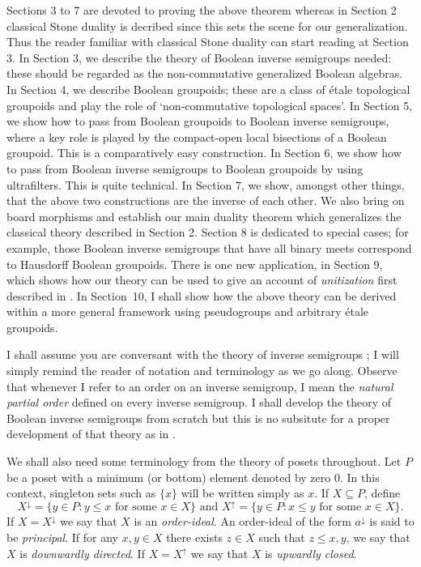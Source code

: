 \documentclass[a4paper]{amsart}
\begin{document}
Sections 3 to 7 are devoted to proving the above theorem
whereas in Section 2 classical Stone duality is decribed since this sets the scene for our generalization.
Thus the reader familiar with classical Stone duality can start reading at Section 3.
In Section 3, we describe the theory of Boolean inverse semigroups needed:
these should be regarded as the non-commutative generalized Boolean algebras.
In Section 4, we describe Boolean groupoids; these are a class of \'etale topological groupoids 
and play the role of `non-commutative topological spaces'.  
In Section 5, we show how to pass from Boolean groupoids to Boolean inverse semigroups,
where a key role is played by the compact-open local bisections of a Boolean groupoid.
This is a comparatively easy construction.
In Section 6, we show how to pass from Boolean inverse semigroups to Boolean groupoids by using ultrafilters.
This is quite technical.
In Section 7, we show, amongst other things, that the above two constructions are the inverse of each other.
We also bring on board morphisms and establish our main duality theorem which generalizes  the classical theory
described in Section 2.
Section 8 is dedicated to special cases; for example, those Boolean inverse semigroups
that have all binary meets correspond to Hausdorff Boolean groupoids.
There is one new application, in Section 9, which shows how our theory can be used to give an account 
of {\em unitization} first described in \cite[Definition 6.6.1]{W}.
In Section~10, I shall show how the above theory can be derived within a more general framework
using pseudogroups and arbitrary \'etale groupoids.

I shall assume you are conversant with the theory of inverse semigroups \cite{Lawson1998};
I will simply remind the reader of notation and terminology as we go along.
Observe that whenever I refer to an order on an inverse semigroup, 
I mean the {\em natural partial order} defined on every inverse semigroup.
I shall develop the theory of Boolean inverse semigroups from scratch
but this is no subsitute for a proper development of that theory as in \cite{W}.

We shall also need some terminology from the theory of posets throughout.
Let $P$ be a poset with a minimum (or bottom) element denoted by zero $0$.
In this context, singleton sets such as $\{x\}$ will be written simply as $x$.
If $X \subseteq P$, define
$$X^{\downarrow} = \{y \in P \colon y \leq x \text{ for some } x \in X \}
\text{ and } 
X^{\uparrow} = \{y \in P \colon x \leq y \text{ for some } x \in X\}.$$
If $X = X^{\downarrow}$ we say that $X$ is an {\em order-ideal}.
An order-ideal of the form $a^{\downarrow}$ is said to be {\em principal}. 
If for any $x,y \in X$ there exists $z \in X$ such that $z \leq x,y$,
we say that $X$ is {\em downwardly directed}.
If $X = X^{\uparrow}$ we say that $X$ is {\em upwardly closed}.
\end{document}
